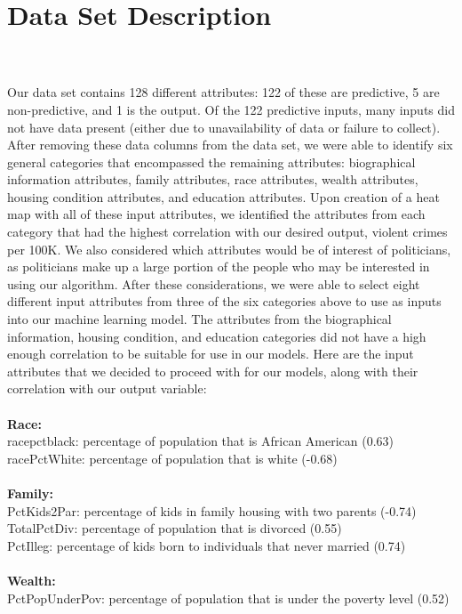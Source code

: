 \documentclass[letterpaper, 11 pt, conference]{article}
\begin{document}
\section{Data Set Description}
\\
\\Our data set contains 128 different attributes: 122 of these are predictive, 5 are non-predictive, and 1 is the output. Of the 122 predictive inputs, many inputs did not have data present (either due to unavailability of data or failure to collect). After removing these data columns from the data set, we were able to identify six general categories that encompassed the remaining attributes: biographical information attributes, family attributes, race attributes, wealth attributes, housing condition attributes, and education attributes. Upon creation of a heat map with all of these input attributes, we identified the attributes from each category that had the highest correlation with our desired output, violent crimes per 100K. We also considered which attributes would be of interest of politicians, as politicians make up a large portion of the people who may be interested in using our algorithm. After these considerations, we were able to select eight different input attributes from three of the six categories above to use as inputs into our machine learning model. The attributes from the biographical information, housing condition, and education categories did not have a high enough correlation to be suitable for use in our models. Here are the input attributes that we decided to proceed with for our models, along with their correlation with our output variable:
\\
\\\textbf{Race:}
\\racepctblack: percentage of population that is African American (0.63)
\\racePctWhite: percentage of population that is white (-0.68)
\\
\\\textbf{Family:}
\\PctKids2Par: percentage of kids in family housing with two parents (-0.74)
\\TotalPctDiv: percentage of population that is divorced (0.55)
\\PctIlleg: percentage of kids born to individuals that never married (0.74)
\\
\\\textbf{Wealth:}
\\PctPopUnderPov: percentage of population that is under the poverty level (0.52)
\end{document}
